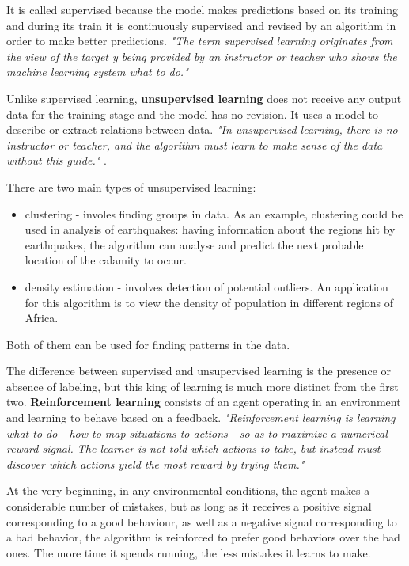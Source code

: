 \documentclass[runningheads,a4paper,12pt]{report}
\begin{document}
It is called supervised because the model makes predictions based on its training and during its train it is continuously supervised and revised by an algorithm in order to make better predictions.
\emph{"The term supervised learning originates from the view of the target y being provided by an instructor or teacher who shows the machine learning system what to do."} \cite{deep-learning}

\bigskip
\bigskip

Unlike supervised learning, \textbf{unsupervised learning} does not receive any output data for the training stage and the model has no revision. It uses a model to describe or extract relations between data. 
\emph{"In unsupervised learning, there is no instructor or teacher, and the algorithm must learn to make sense of the data without this guide."} \cite{deep-learning}.

There are two main types of unsupervised learning:
\begin{itemize}
\item clustering - involes finding groups in data. As an example, clustering could be used in analysis of earthquakes: having information about the regions hit by earthquakes, the algorithm can analyse and predict the next probable location of the calamity to occur. 
\item density estimation - involves detection of potential outliers. An application for this algorithm is to view the density of population in different regions of Africa.
\end{itemize}

Both of them can be used for finding patterns in the data. 

\bigskip
\bigskip

The difference between supervised and unsupervised learning is the presence or absence of labeling, but this king of learning is much more distinct from the first two. \textbf{Reinforcement learning} consists of an agent operating in an environment and learning to behave based on a feedback. 
\emph{"Reinforcement learning is learning what to do - how to map situations to actions - so as to maximize a numerical reward signal. The learner is not told which actions to take, but instead must discover which actions yield the most reward by trying them."} \cite{reinforcement-learning-introduction}

At the very beginning, in any environmental conditions, the agent makes a considerable number of mistakes, but as long as it receives a positive signal corresponding to a good behaviour, as well as a negative signal corresponding to a bad behavior, the algorithm is reinforced to prefer good behaviors over the bad ones. The more time it spends running, the less mistakes it learns to make. 
\end{document}
